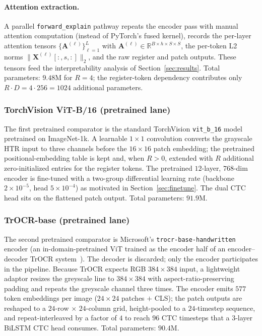 \paragraph{Attention extraction.} A parallel \texttt{forward\_explain} pathway repeats the encoder pass with manual attention computation (instead of PyTorch's fused kernel), records the per-layer attention tensors $\{\mathbf{A}^{(\ell)}\}_{\ell=1}^{L}$ with $\mathbf{A}^{(\ell)} \in \mathbb{R}^{B \times h \times S \times S}$, the per-token L2 norms $\|\mathbf{X}^{(\ell)}[:, s, :]\|_2$, and the raw register and patch outputs. These tensors feed the interpretability analysis of Section~\ref{sec:results}. Total parameters: $9.48$M for $R = 4$; the register-token dependency contributes only $R \cdot D = 4 \cdot 256 = 1024$ additional parameters.

\subsubsection{TorchVision ViT-B/16 (pretrained lane)}

The first pretrained comparator is the standard TorchVision \texttt{vit\_b\_16} model pretrained on ImageNet-1k. A learnable $1 \times 1$ convolution converts the grayscale HTR input to three channels before the $16 \times 16$ patch embedding; the pretrained positional-embedding table is kept and, when $R > 0$, extended with $R$ additional zero-initialized entries for the register tokens. The pretrained $12$-layer, $768$-dim encoder is fine-tuned with a two-group differential learning rate (backbone $2 \times 10^{-5}$, head $5 \times 10^{-4}$) as motivated in Section~\ref{sec:finetune}. The dual CTC head sits on the flattened patch output. Total parameters: $91.9$M.

\subsubsection{TrOCR-base (pretrained lane)}

The second pretrained comparator is Microsoft's \texttt{trocr-base-handwritten} encoder (an in-domain-pretrained ViT trained as the encoder half of an encoder--decoder TrOCR system~\cite{li2023trocr}). The decoder is discarded; only the encoder participates in the pipeline. Because TrOCR expects RGB $384 \times 384$ input, a lightweight adaptor resizes the greyscale line to $384 \times 384$ with aspect-ratio-preserving padding and repeats the greyscale channel three times. The encoder emits $577$ token embeddings per image ($24 \times 24$ patches $+$ CLS); the patch outputs are reshaped to a $24$-row $\times$ $24$-column grid, height-pooled to a $24$-timestep sequence, and repeat-interleaved by a factor of $4$ to reach $96$ CTC timesteps that a $3$-layer BiLSTM CTC head consumes. Total parameters: $90.4$M.

